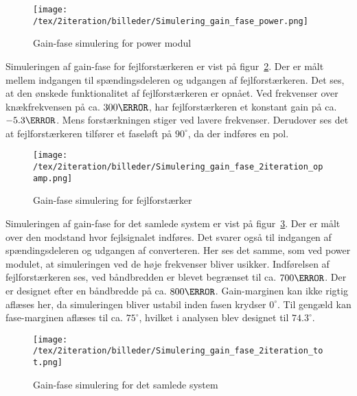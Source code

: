 \begin{figure}[H]
	\center
	\texttt{[image: /tex/2iteration/billeder/Simulering\_gain\_fase\_power.png]}
	\caption{Gain-fase simulering for power modul}
	\label{fig:sim_gain_fase_power}
\end{figure}

\noindent Simuleringen af gain-fase for fejlforstærkeren er vist på figur~\ref{fig:sim_gain_fase_2iteration_opamp}. Der er målt mellem indgangen til spændingsdeleren og udgangen af fejlforstærkeren. Det ses, at den ønskede funktionalitet af fejlforstærkeren er opnået. Ved frekvenser over knækfrekvensen på ca. $300\hertz$, har fejlforstærkeren et konstant gain på ca. $-5.3\decibel$. Mens forstærkningen stiger ved lavere frekvenser. Derudover ses det at fejlforstærkeren tilfører et faseløft på $90^\circ$, da der indføres en pol.

\begin{figure}[H]
	\center
	\texttt{[image: /tex/2iteration/billeder/Simulering\_gain\_fase\_2iteration\_opamp.png]}
	\caption{Gain-fase simulering for fejlforstærker}
	\label{fig:sim_gain_fase_2iteration_opamp}
\end{figure}


\noindent Simuleringen af gain-fase for det samlede system er vist på figur~\ref{fig:sim_gain_fase_2iteration_tot}. Der er målt over den modstand hvor fejlsignalet indføres. Det svarer også til indgangen af spændingsdeleren og udgangen af converteren. Her ses det samme, som ved power modulet, at simuleringen ved de høje frekvenser bliver usikker. Indførelsen af fejlforstærkeren ses, ved båndbredden er blevet begrænset til ca. $700\hertz$. Der er designet efter en båndbredde på ca. $800\hertz$. Gain-marginen kan ikke rigtig aflæses her, da simuleringen bliver ustabil inden fasen krydser $0^\circ$. Til gengæld kan fase-marginen aflæses til ca. $75^\circ$, hvilket i analysen blev designet til $74.3^\circ$. 

\begin{figure}[H]
	\center
	\texttt{[image: /tex/2iteration/billeder/Simulering\_gain\_fase\_2iteration\_tot.png]}
	\caption{Gain-fase simulering for det samlede system}
	\label{fig:sim_gain_fase_2iteration_tot}
\end{figure}




